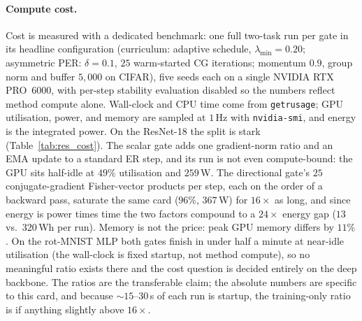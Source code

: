\paragraph{Compute cost.} Cost is measured with a dedicated benchmark: one full two-task run per gate in its headline configuration (curriculum: adaptive schedule, $\lambda_{\min}{=}0.20$; asymmetric PER: $\delta{=}0.1$, $25$ warm-started CG iterations; momentum $0.9$, group norm and buffer $5{,}000$ on CIFAR), five seeds each on a single NVIDIA RTX PRO~6000, with per-step stability evaluation disabled so the numbers reflect method compute alone. Wall-clock and CPU time come from \texttt{getrusage}; GPU utilisation, power, and memory are sampled at $1$\,Hz with \texttt{nvidia-smi}, and energy is the integrated power. On the ResNet-18 the split is stark (Table~\ref{tab:res_cost}). The scalar gate adds one gradient-norm ratio and an EMA update to a standard ER step, and its run is not even compute-bound: the GPU sits half-idle at $49\%$ utilisation and $259$\,W. The directional gate's $25$ conjugate-gradient Fisher-vector products per step, each on the order of a backward pass, saturate the same card ($96\%$, $367$\,W) for $16\times$ as long, and since energy is power times time the two factors compound to a $24\times$ energy gap ($13$ vs.\ $320$\,Wh per run). Memory is not the price: peak GPU memory differs by $11\%$. On the rot-MNIST MLP both gates finish in under half a minute at near-idle utilisation (the wall-clock is fixed startup, not method compute), so no meaningful ratio exists there and the cost question is decided entirely on the deep backbone. The ratios are the transferable claim; the absolute numbers are specific to this card, and because ${\sim}15$--$30$\,s of each run is startup, the training-only ratio is if anything slightly above $16\times$.

